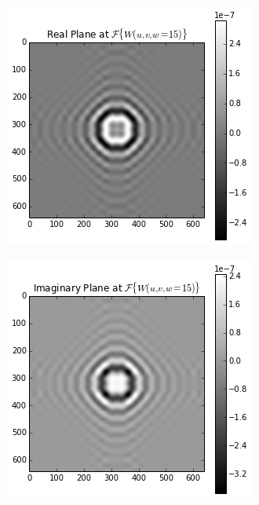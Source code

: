 \begin{figure}[h]
  \begin{mdframed}
    \centering
    \begin{subfigure}[b]{0.33\textwidth}
      \centering
      \includegraphics[width=\textwidth]{images/real_plane.png}
      \caption{}
    \end{subfigure}  
    \begin{subfigure}[b]{0.33\textwidth}
      \centering
      \includegraphics[width=\textwidth]{images/imag_plane.png}

\end{subfigure}
\end{mdframed}
\end{figure}
